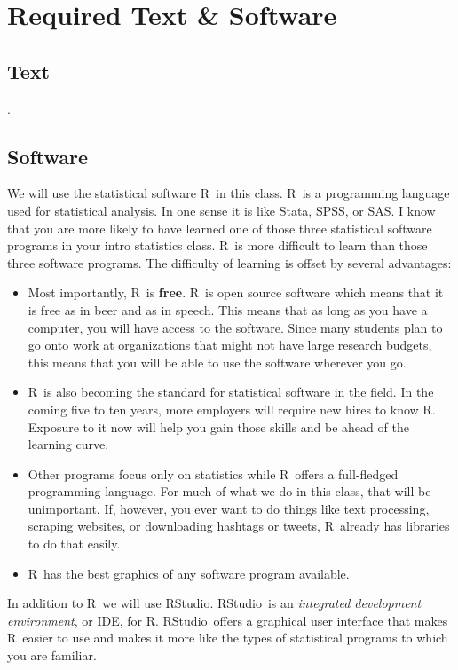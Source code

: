 \documentclass[11pt]{syllabus}
\newcommand{\R}{\textsf{R}}
\newcommand{\RStudio}{\textsf{RStudio}}
\begin{document}
\showgrades


\section{Required Text \& Software}
\subsection{Text}
.

\subsection{Software}
We will use the statistical software \R\ in this class. \R\ is a programming language used for statistical analysis. In one sense it is like Stata, SPSS, or SAS. I know that you are more likely to have learned one of those three statistical software programs in your intro statistics class. \R\ is more difficult to learn than those three software programs. The difficulty of learning is offset by several advantages: 

\begin{itemize}
\item Most importantly, \R\ is \textbf{free}. \R\ is open source software which means that it is free as in beer and as in speech. This means that as long as you have a computer, you will have access to the software. Since many students plan to go onto work at organizations that might not have large research budgets, this means that you will be able to use the software wherever you go. 
\item \R\ is also becoming the standard for statistical software in the field. In the coming five to ten years, more employers will require new hires to know \R. Exposure to it now will help you gain those skills and be ahead of the learning curve. 
\item Other programs focus only on statistics while \R\ offers a full-fledged programming language. For much of what we do in this class, that will be unimportant. If, however, you ever want to do things like text processing, scraping websites, or downloading hashtags or tweets, \R\ already has libraries to do that easily. 
\item \R\ has the best graphics of any software program available. 
\end{itemize}

In addition to \R\, we will use \RStudio. \RStudio\ is an \textsl{integrated development environment}, or IDE, for \R. \RStudio\ offers a graphical user interface that makes \R\ easier to use and makes it more like the types of statistical programs to which you are familiar. 
\end{document}
